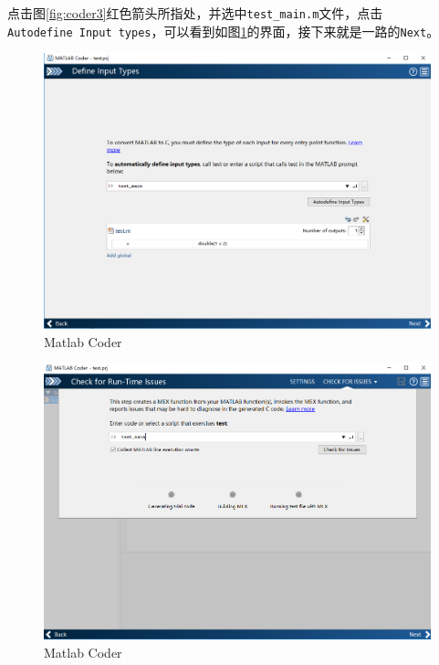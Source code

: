 \documentclass[]{ctexbook}
\begin{document}
点击图\ref{fig:coder3}红色箭头所指处，并选中\texttt{test\_main.m}文件，点击\texttt{Autodefine\ Input\ types}，可以看到如图\ref{fig:coder4}的界面，接下来就是一路的\texttt{Next}。

\begin{figure}

{\centering \includegraphics[width=0.95\linewidth]{img/coder4} 

}

\caption{Matlab Coder}\label{fig:coder4}
\end{figure}

\begin{figure}

{\centering \includegraphics[width=0.95\linewidth]{img/coder5} 

}

\caption{Matlab Coder}\label{fig:coder5}
\end{figure}
\end{document}
